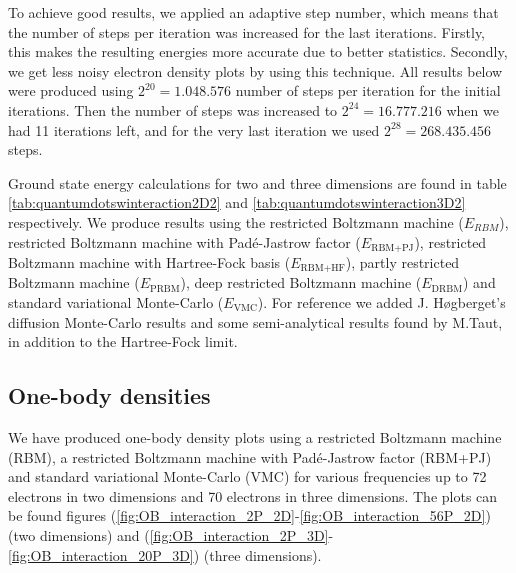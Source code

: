 To achieve good results, we applied an adaptive step number, which means that the number of steps per iteration was increased for the last iterations. Firstly, this makes the resulting energies more accurate due to better statistics. Secondly, we get less noisy electron density plots by using this technique. All results below were produced using $2^{20}=1.048.576$ number of steps per iteration for the initial iterations. Then the number of steps was increased to $2^{24}=16.777.216$ when we had 11 iterations left, and for the very last iteration we used $2^{28}=268.435.456$ steps.

Ground state energy calculations for two and three dimensions are found in table \eqref{tab:quantumdotswinteraction2D2} and \eqref{tab:quantumdotswinteraction3D2} respectively. We produce results using the restricted Boltzmann machine ($E_{RBM}$), restricted Boltzmann machine with Padé-Jastrow factor ($E_{\text{RBM+PJ}}$), restricted Boltzmann machine with Hartree-Fock basis ($E_{\text{RBM+HF}}$), partly restricted Boltzmann machine ($E_{\text{PRBM}}$), deep restricted Boltzmann machine ($E_{\text{DRBM}}$) and standard variational Monte-Carlo ($E_{\text{VMC}}$). For reference we added J. Høgberget's diffusion Monte-Carlo results and some semi-analytical results found by M.Taut, in addition to the Hartree-Fock limit. 

\subsection{One-body densities}
We have produced one-body density plots using a restricted Boltzmann machine (RBM), a restricted Boltzmann machine with Padé-Jastrow factor (RBM+PJ) and standard variational Monte-Carlo (VMC) for various frequencies up to 72 electrons in two dimensions and 70 electrons in three dimensions. The plots can be found figures (\ref{fig:OB_interaction_2P_2D}-\ref{fig:OB_interaction_56P_2D}) (two dimensions) and (\ref{fig:OB_interaction_2P_3D}-\ref{fig:OB_interaction_20P_3D}) (three dimensions).


